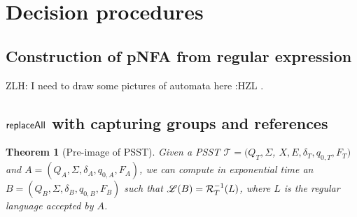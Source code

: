 \documentclass[sigplan,review,anonymous]{acmart}\settopmatter{printfolios=true,printccs=false,printacmref=false}
\newcommand{\zhilei}[1]{\color{green} {ZLH: #1 :HZL} \color{black}}
\newcommand{\zhilei}[1]{}
\newtheorem{theorem}{Theorem}
\newcommand\PSST{{\sf PSST}}
\newcommand\psst{\mathcal{T}}
\begin{document}
\section{Decision procedures}

\subsection{Construction of pNFA from regular expression}
\label{pNFA_cons}

\zhilei{I need to draw some pictures of automata here}.

\subsection{$\mathsf{replaceAll}$ with capturing groups and references}

\begin{theorem}[Pre-image of \PSST{}]
  Given a \PSST{} $\psst = (Q_T, \Sigma$, $X, E, \delta_T, q_{0, T}, F_T)$ and \FA{} $A
  = (Q_A, \Sigma, \delta_A, q_{0, A}, F_A)$, we can compute in exponential time an \FA{} $B = (Q_B,
  \Sigma, \delta_B, q_{0, B}, F_B)$ such that $\mathscr{L}(B) = \mathcal{R}^{-1}_T(L)$, where $L$ is the regular language accepted by $A$. 
\end{theorem}
 
\end{document}
